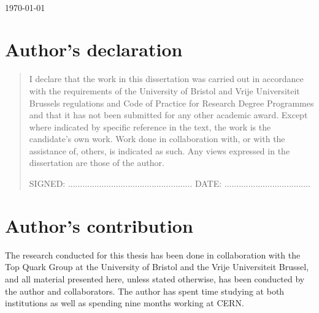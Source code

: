 \begin{titlepage}
\begin{center}
\begin{minipage}{15cm}
\end{minipage}\\
\vspace{25mm}
{\large \today\par}
\vspace{12mm}
\end{center}
\end{titlepage}



\newpage\null\thispagestyle{empty}
\chapter*{Author's declaration}

\begin{quote}
I declare that the work in this dissertation was carried out in accordance with the requirements of the University of Bristol and Vrije Universiteit Brussels regulations and Code of Practice for Research Degree Programmes and that it has not been submitted for any other academic award. Except where indicated by specific reference in the text, the work is the candidate's own work. Work done in collaboration with, or with the assistance of, others, is indicated as such. Any views expressed in the dissertation are those of the author.

\vspace{1.5cm}
\noindent
\hspace{-0.75cm}\textsc{SIGNED: .................................................... DATE: ....................................}
\end{quote}



\newpage\null\thispagestyle{empty}
\chapter*{Author's contribution}

The research conducted for this thesis has been done in collaboration with the Top Quark Group at the University of Bristol and the Vrije Universiteit Brussel, and all material presented here, unless stated otherwise, has been conducted by the author and collaborators.
The author has spent time studying at both institutions as well as spending nine months working at CERN.

